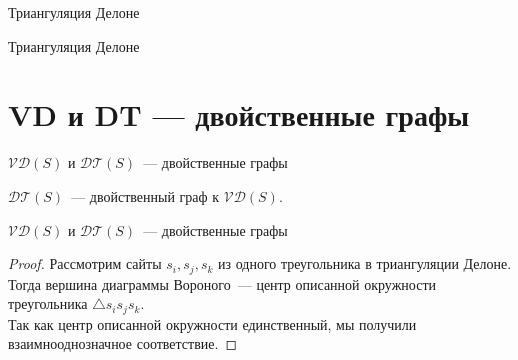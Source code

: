     \begin{frame}{Триангуляция Делоне}
         \vspace{2mm}
         \begin{center}


        \end{center}

    \end{frame}

    \begin{frame}{Триангуляция Делоне}
         \vspace{2mm}
         \begin{center}


        \end{center}

    \end{frame}

\section{VD и DT — двойственные графы}

    \begin{frame}{$\mathcal{V}\mathcal{D}(S)$ и $\mathcal{D}\mathcal{T}(S)$~--- двойственные графы}

        \vspace{2mm}

        \begin{thm}

            $\mathcal{D}\mathcal{T}(S)$~--- двойственный граф к $\mathcal{V}\mathcal{D}(S)$.

        \end{thm}

        \begin{center}


        \end{center}

    \end{frame}

    \begin{frame}{$\mathcal{V}\mathcal{D}(S)$ и $\mathcal{D}\mathcal{T}(S)$~--- двойственные графы}

        \begin{proof}

            Рассмотрим сайты $s_i, s_j, s_k$ из одного треугольника в триангуляции Делоне. Тогда вершина диаграммы Вороного~---
            центр описанной окружности треугольника $\triangle s_i s_j s_k$.\\

            Так как центр описанной окружности единственный, мы получили взаимнооднозначное соответствие.

        \end{proof}

    \end{frame}

